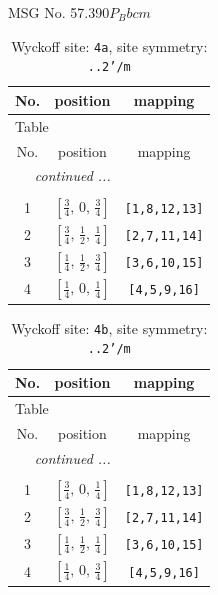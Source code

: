 \documentclass[fleqn,8pt]{jsarticle}
\begin{document}
\setcounter{MaxMatrixCols}{32}

\renewcommand{\tablename}{Table~}
\renewcommand{\figurename}{Figure~}
\begin{center}
\LARGE
MSG No. 57.390\quad$P_{B}bcm$
\end{center}
\renewcommand{\arraystretch}{1.2}
\begin{longtable}{ccc}
\caption{Wyckoff site: {\tt 4a}, site symmetry: {\tt ..2'/m}}
 \\
 \hline \hline
No. & position & mapping \\ \hline \endfirsthead

\multicolumn{2}{l}{\tablename\ \thetable{}} \\
 \hline \hline
No. & position & mapping \\ \hline \endhead

 \hline \hline
\multicolumn{2}{r}{\footnotesize\it continued ...} \\ \endfoot

 \hline \hline
\multicolumn{2}{r}{} \\ \endlastfoot

1 & $\left[ \frac{3}{4},\, 0,\, \frac{3}{4} \right]$ & {\tt [1,8,12,13]} \\ \hline
2 & $\left[ \frac{3}{4},\, \frac{1}{2},\, \frac{1}{4} \right]$ & {\tt [2,7,11,14]} \\ \hline
3 & $\left[ \frac{1}{4},\, \frac{1}{2},\, \frac{3}{4} \right]$ & {\tt [3,6,10,15]} \\ \hline
4 & $\left[ \frac{1}{4},\, 0,\, \frac{1}{4} \right]$ & {\tt [4,5,9,16]} \\
\end{longtable}
\renewcommand{\arraystretch}{1.2}
\begin{longtable}{ccc}
\caption{Wyckoff site: {\tt 4b}, site symmetry: {\tt ..2'/m}}
 \\
 \hline \hline
No. & position & mapping \\ \hline \endfirsthead

\multicolumn{2}{l}{\tablename\ \thetable{}} \\
 \hline \hline
No. & position & mapping \\ \hline \endhead

 \hline \hline
\multicolumn{2}{r}{\footnotesize\it continued ...} \\ \endfoot

 \hline \hline
\multicolumn{2}{r}{} \\ \endlastfoot

1 & $\left[ \frac{3}{4},\, 0,\, \frac{1}{4} \right]$ & {\tt [1,8,12,13]} \\ \hline
2 & $\left[ \frac{3}{4},\, \frac{1}{2},\, \frac{3}{4} \right]$ & {\tt [2,7,11,14]} \\ \hline
3 & $\left[ \frac{1}{4},\, \frac{1}{2},\, \frac{1}{4} \right]$ & {\tt [3,6,10,15]} \\ \hline
4 & $\left[ \frac{1}{4},\, 0,\, \frac{3}{4} \right]$ & {\tt [4,5,9,16]} \\
\end{longtable}
\end{document}

